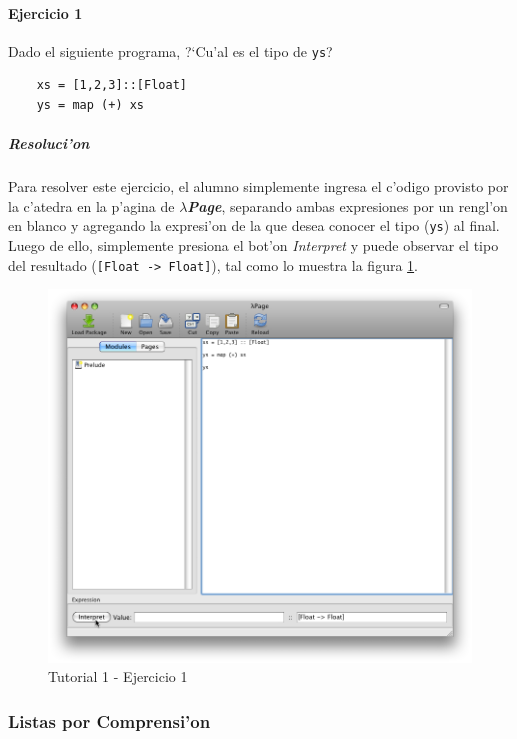 \documentclass[a4paper]{article}
\newcommand{\hpage}{\textbf{\textsl{$\lambda$Page}}}
\begin{document}
\paragraph{Ejercicio 1}Dado el siguiente programa, ?`Cu'al es el tipo de \texttt{ys}?
\lstset{language=haskell, frame=single, tabsize=4}
\begin{center}\begin{lstlisting}
	xs = [1,2,3]::[Float]
	ys = map (+) xs
\end{lstlisting}\end{center}
\subparagraph{Resoluci'on}Para resolver este ejercicio, el alumno simplemente ingresa el c'odigo provisto por la c'atedra en la p'agina de \hpage, separando ambas expresiones por un rengl'on en blanco y agregando la expresi'on de la que desea conocer el tipo (\texttt{ys}) al final.  Luego de ello, simplemente presiona el bot'on \textsl{Interpret} y puede observar el tipo del resultado (\texttt{[Float -> Float]}), tal como lo muestra la figura \ref{tut101}.
\begin{figure}[hp]
	\begin{center}
        	\includegraphics[width=.75\textwidth]{pictures/tut1/01}
		\caption{Tutorial 1 - Ejercicio 1}
		\label{tut101}
	\end{center}
\end{figure}

\newpage
\subsubsection{Listas por Comprensi'on}
\end{document}
